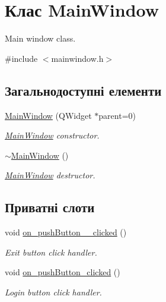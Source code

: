 \hypertarget{classMainWindow}{\section{Клас Main\-Window}
\label{classMainWindow}
}


Main window class.  




{\ttfamily \#include $<$mainwindow.\-h$>$}

\subsection*{Загальнодоступні елементи}
\begin{DoxyCompactItemize}
\item 
\hyperlink{classMainWindow_a8b244be8b7b7db1b08de2a2acb9409db}{Main\-Window} (Q\-Widget $\ast$parent=0)
\begin{DoxyCompactList}\small\item\em \hyperlink{classMainWindow}{Main\-Window} constructor. \end{DoxyCompactList}\item 
\hypertarget{classMainWindow_ae98d00a93bc118200eeef9f9bba1dba7}{\hyperlink{classMainWindow_ae98d00a93bc118200eeef9f9bba1dba7}{$\sim$\-Main\-Window} ()}\label{classMainWindow_ae98d00a93bc118200eeef9f9bba1dba7}

\begin{DoxyCompactList}\small\item\em \hyperlink{classMainWindow}{Main\-Window} destructor. \end{DoxyCompactList}\end{DoxyCompactItemize}
\subsection*{Приватні слоти}
\begin{DoxyCompactItemize}
\item 
\hypertarget{classMainWindow_ae0e46dc3da4ee07bf66e73e20300220c}{void \hyperlink{classMainWindow_ae0e46dc3da4ee07bf66e73e20300220c}{on\-\_\-push\-Button\-\_\-\_\-clicked} ()}\label{classMainWindow_ae0e46dc3da4ee07bf66e73e20300220c}

\begin{DoxyCompactList}\small\item\em Exit button click handler. \end{DoxyCompactList}\item 
\hypertarget{classMainWindow_a4de79c63c7fa0b8d7c468ac71f20be81}{void \hyperlink{classMainWindow_a4de79c63c7fa0b8d7c468ac71f20be81}{on\-\_\-push\-Button\-\_\-clicked} ()}\label{classMainWindow_a4de79c63c7fa0b8d7c468ac71f20be81}

\begin{DoxyCompactList}\small\item\em Login button click handler. \end{DoxyCompactList}\end{DoxyCompactItemize}
